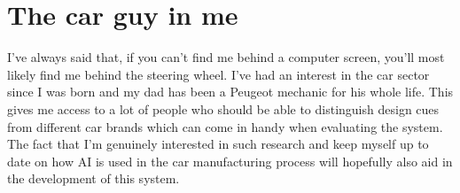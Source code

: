 
\section{The car guy in me}
\label{sec:carguy}

I've always said that, if you can't find me behind a computer screen, you'll most likely find me behind the steering wheel.
I've had an interest in the car sector since I was born and my dad has been a Peugeot mechanic for his whole life.
This gives me access to a lot of people who should be able to distinguish design cues from different car brands which can come in handy when evaluating the system.
The fact that I'm genuinely interested in such research and keep myself up to date on how AI is used in the car manufacturing process will hopefully also aid in the development of this system.  